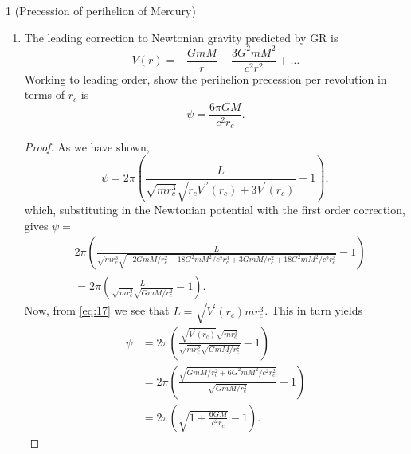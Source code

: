 \documentclass[11pt]{article}
\begin{document}
\begin{problem}{1 (Precession of perihelion of Mercury)}
\begin{enumerate}[label=(\alph*)]
		\item The leading correction to Newtonian gravity predicted by GR is
		      \begin{equation}
			      \label{eq:7}
			      V(r) = - \frac{GmM}{r} - \frac{3 G^2 m M^2}{c^2 r^2} + \dots
		      \end{equation}
		      Working to leading order, show the perihelion precession per revolution in terms of \( r_c \) is
		      \begin{equation}
			      \label{eq:8}
			      \psi = \frac{6 \pi G M }{c^2 r_{c}}.
		      \end{equation}
		      \begin{proof}
			      As we have shown,
			      \begin{equation}
				      \label{eq:30}
				      \psi = 2\pi \left( \frac{L}{\sqrt{m r_{c}^3} \sqrt{r_{c} V^{\prime\prime}(r_c) + 3 V^{\prime}(r_c)}} - 1 \right),
			      \end{equation}
			      which, substituting in the Newtonian potential with the first order correction, gives \( \psi = \)
            \begin{equation}
			      \begin{aligned}
				      \label{eq:34}
				       & 2\pi \left( \frac{L}{\sqrt{m r_{c}^3} \sqrt{-2GmM/r_{c}^2 - 18G^2mM^2/c^2r_{c}^3 + 3GmM/r_{c}^2 + 18G^2mM^2/c^2r_{c}^3}} - 1 \right) \\
				       & = 2\pi \left( \frac{L}{\sqrt{mr_{c}^3} \sqrt{GmM/ r_{c}^2}} - 1 \right).
			      \end{aligned}
            \end{equation}
			      Now, from \cref{eq:17} we see that \( L = \sqrt{V^{\prime}(r_c) m r_c^3} \).
			      This in turn yields
            \begin{equation}
			      \begin{aligned}
				      \label{eq:35}
				      \psi & = 2\pi \left( \frac{\sqrt{V^{\prime}(r_c)} \sqrt{mr_{c}^3}}{\sqrt{m r_{c}^3} \sqrt{GmM/r_{c}^2}} - 1\right) \\
				           & = 2\pi \left( \frac{\sqrt{GmM/r_{c}^2 + 6G^2mM^2/c^2r_{c}^2}}{\sqrt{GmM/r_{c}^2}} - 1 \right)               \\
				           & = 2\pi \left( \sqrt{1 + \frac{6GM}{c^2 r_{c}}} - 1\right).
			      \end{aligned}
            \end{equation}


\end{proof}
\end{enumerate}
\end{problem}
\end{document}
